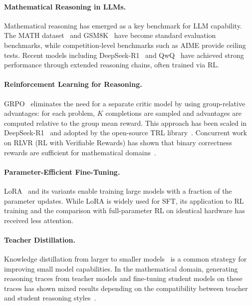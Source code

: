 \documentclass[11pt,a4paper]{article}
\begin{document}
\paragraph{Mathematical Reasoning in LLMs.} Mathematical reasoning has emerged as a key benchmark for LLM capability. The MATH dataset~\citep{hendrycks2021measuring} and GSM8K~\citep{cobbe2021gsm8k} have become standard evaluation benchmarks, while competition-level benchmarks such as AIME provide ceiling tests. Recent models including DeepSeek-R1~\citep{deepseek2025r1} and QwQ~\citep{qwq32b} have achieved strong performance through extended reasoning chains, often trained via RL.

\paragraph{Reinforcement Learning for Reasoning.} GRPO~\citep{shao2024deepseekmath} eliminates the need for a separate critic model by using group-relative advantages: for each problem, $K$ completions are sampled and advantages are computed relative to the group mean reward. This approach has been scaled in DeepSeek-R1~\citep{deepseek2025r1} and adopted by the open-source TRL library~\citep{vonwerra2022trl}. Concurrent work on RLVR (RL with Verifiable Rewards) has shown that binary correctness rewards are sufficient for mathematical domains~\citep{lambert2024rlvr}.

\paragraph{Parameter-Efficient Fine-Tuning.} LoRA~\citep{hu2022lora} and its variants enable training large models with a fraction of the parameter updates. While LoRA is widely used for SFT, its application to RL training and the comparison with full-parameter RL on identical hardware has received less attention.

\paragraph{Teacher Distillation.} Knowledge distillation from larger to smaller models~\citep{hinton2015distilling} is a common strategy for improving small model capabilities. In the mathematical domain, generating reasoning traces from teacher models and fine-tuning student models on these traces has shown mixed results depending on the compatibility between teacher and student reasoning styles~\citep{yu2024metamath, mukherjee2023orca}.
\end{document}

